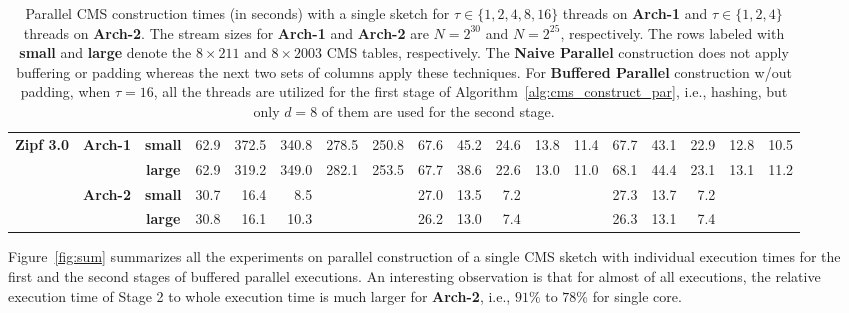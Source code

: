 \documentclass[10pt, conference, compsocconf]{IEEEtran}
\begin{document}
\begin{table}[]
{{\begin{tabular}{ccc||rrrrr|rrrrr|rrrrr}
\multicolumn{1}{c}{\multirow{4}{*}{\textbf{Zipf 3.0}}} 
&\multirow{2}{*}{\textbf{Arch-1}} & \textbf{small}  & 62.9  & 372.5  & 340.8  & 278.5  & 250.8 & 67.6  & 45.2  & 24.6  & 13.8  & 11.4  & 67.7  & 43.1  & 22.9    & 12.8  & 10.5 \\
&& \textbf{large} & 62.9  & 319.2  & 349.0  & 282.1  & 253.5  & 67.7  & 38.6  & 22.6  & 13.0& 11.0&68.1&44.4&23.1&13.1& 11.2 \\ \cline{2-18}
&\multirow{2}{*}{\textbf{Arch-2}}  & \textbf{small}  & 30.7  & 16.4   & 8.5   &        &       & 27.0  & 13.5  & 7.2  &       &       & 27.3  & 13.7  & 7.2  &       &      \\
&& \textbf{large} & 30.8 & 16.1   & 10.3   &        &       & 26.2  & 13.0  & 7.4  &       &       & 26.3  & 13.1  & 7.4  &       &  \\  

\end{tabular}
}
}
\caption{Parallel CMS construction times (in seconds) with a single sketch for $\tau \in \{1, 2, 4, 8, 16\}$ threads on \textbf{Arch-1} and  $\tau \in \{1, 2, 4\}$ threads on \textbf{Arch-2}. The stream sizes for \textbf{Arch-1} and \textbf{Arch-2} are $N = 2^{30}$ and $N = 2^{25}$, respectively. The rows labeled with {\bf small} and {\bf large} denote the $8 \times 211$ and $8 \times 2003$ CMS tables, respectively. The {\bf Naive Parallel} construction does not apply buffering or padding whereas the next two sets of columns apply these techniques. For {\bf Buffered Parallel} construction w/out padding, when $\tau = 16$, all the threads are utilized for the first stage of Algorithm~\ref{alg:cms_construct_par}, i.e., hashing, but only $d = 8$ of them are used for the second stage.}\label{tbl:batch}
\end{table}

Figure~\ref{fig:sum} summarizes all the experiments on parallel construction of a single CMS sketch with individual execution times for the first and the second stages of buffered parallel executions. An interesting observation is that for almost of all executions, the relative execution time of Stage 2 to whole execution time is much larger for \textbf{Arch-2}, i.e., $91\%$ to $78\%$ for single core. 
\end{document}
